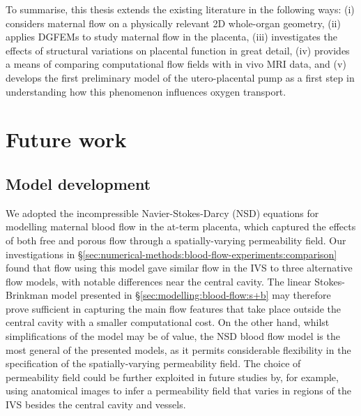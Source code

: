         To summarise, this thesis extends the existing literature in the following ways: (i) considers maternal flow on a physically relevant 2D whole-organ geometry, (ii) applies DGFEMs to study maternal flow in the placenta, (iii) investigates the effects of structural variations on placental function in great detail, (iv) provides a means of comparing computational flow fields with in vivo MRI data, and (v) develops the first preliminary model of the utero-placental pump as a first step in understanding how this phenomenon influences oxygen transport.
        
    \section{Future work}
        \subsection{Model development}        
            We adopted the incompressible Navier-Stokes-Darcy (NSD) equations for modelling maternal blood flow in the at-term placenta, which captured the effects of both free and porous flow through a spatially-varying permeability field. Our investigations in \S\ref{sec:numerical-methods:blood-flow-experiments:comparison} found that flow using this model gave similar flow in the IVS to three alternative flow models, with notable differences near the central cavity. The linear Stokes-Brinkman model presented in \S\ref{sec:modelling:blood-flow:s+b} may therefore prove sufficient in capturing the main flow features that take place outside the central cavity with a smaller computational cost. On the other hand, whilst simplifications of the model may be of value, the NSD blood flow model is the most general of the presented models, as it permits considerable flexibility in the specification of the spatially-varying permeability field. The choice of permeability field could be further exploited in future studies by, for example, using anatomical images to infer a permeability field that varies in regions of the IVS besides the central cavity and vessels.

